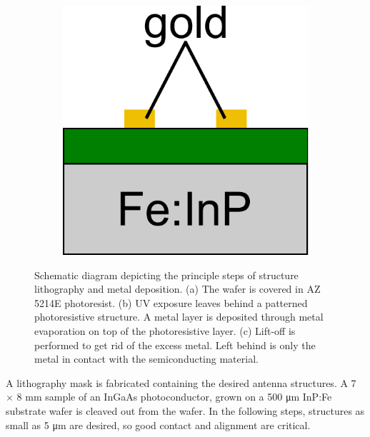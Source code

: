 \begin{figure}[h]
\begin{subfigure}[b]{0.225\textwidth}
        \caption{}
        \label{fig:fab12}
    \end{subfigure}
    \hfill
    \begin{subfigure}[b]{0.225\textwidth}
        \centering
        \includegraphics[width=\textwidth]{figures/Fabrication/fab1_3.pdf}
        \caption{}
        \label{fig:fab13}
    \end{subfigure}
    \caption{Schematic diagram depicting the principle steps of structure lithography and metal deposition. (a) The wafer is covered in AZ 5214E photoresist. (b) UV exposure leaves behind a patterned photoresistive structure. A metal layer is deposited through metal evaporation on top of the photoresistive layer. (c) Lift-off is performed to get rid of the excess metal. Left behind is only the metal in contact with the semiconducting material.}
\end{figure}

A lithography mask is fabricated containing the desired antenna structures. A \num{7} $\times$ \num{8} \si{\milli\meter} sample of an InGaAs photoconductor, grown on a \num{500} \si{\micro\meter} InP:Fe substrate wafer is cleaved out from the wafer. In the following steps, structures as small as \num{5} \si{\micro\meter} are desired, so good contact and alignment are critical.



